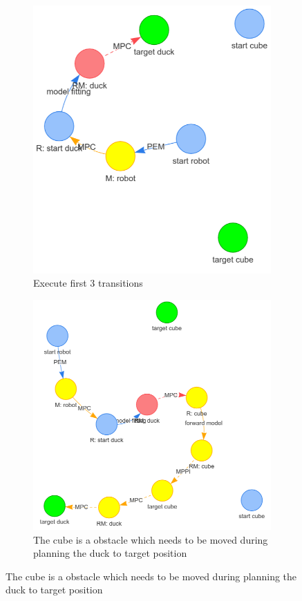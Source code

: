 \begin{figure}[H]
    \ContinuedFloat
     \begin{subfigure}[b]{0.49\textwidth}
         \centering
         \includegraphics[width=\textwidth]{figures/swap/3.png}
         \caption{Execute first 3 transitions}
     \end{subfigure}
     \hfill
     \begin{subfigure}[b]{0.49\textwidth}
         \centering
         \includegraphics[width=\textwidth]{figures/swap/4.png}
         \caption{The cube is a obstacle which needs to be moved during planning the duck to target position}
   \end{subfigure}
   

\end{figure}

